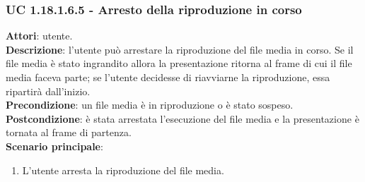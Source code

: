 	\subsubsection{UC 1.18.1.6.5 - Arresto della riproduzione in corso}{
		\label{uc1.18.1.6.5}
		\textbf{Attori}: utente. \\
		\textbf{Descrizione}: l'utente può arrestare la riproduzione del file media in corso. Se il file media è stato ingrandito allora la presentazione ritorna al frame di cui il file media faceva parte; se l'utente decidesse di riavviarne la riproduzione, essa ripartirà dall'inizio.\\
		\textbf{Precondizione}: un file media è in riproduzione o è stato sospeso.	\\
		\textbf{Postcondizione}: è stata arrestata l'esecuzione del file media e la presentazione è tornata al frame di partenza.\\
		\textbf{Scenario principale}:
		\begin{enumerate}
			\item L'utente arresta la riproduzione del file media.
		\end{enumerate}		
	}
